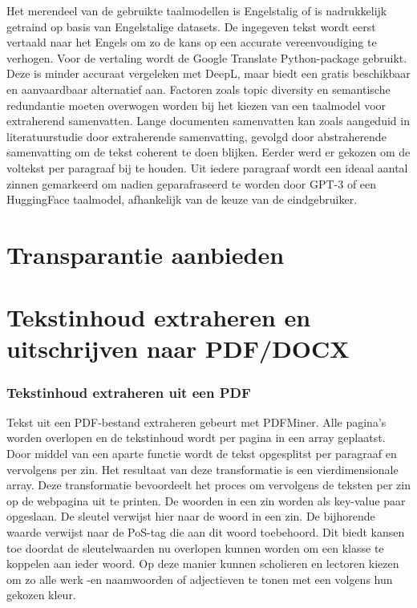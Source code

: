 Het merendeel van de gebruikte taalmodellen is Engelstalig of is nadrukkelijk getraind op basis van Engelstalige datasets. De ingegeven tekst wordt eerst vertaald naar het Engels om zo de kans op een accurate vereenvoudiging te verhogen. Voor de vertaling wordt de Google Translate Python-package gebruikt. Deze is minder accuraat vergeleken met DeepL, maar biedt een gratis beschikbaar en aanvaardbaar alternatief aan. Factoren zoals topic diversity en semantische redundantie moeten overwogen worden bij het kiezen van een taalmodel voor extraherend samenvatten. Lange documenten samenvatten kan zoals aangeduid in literatuurstudie door extraherende samenvatting, gevolgd door abstraherende samenvatting om de tekst coherent te doen blijken. Eerder werd er gekozen om de voltekst per paragraaf bij te houden. Uit iedere paragraaf wordt een ideaal aantal zinnen gemarkeerd om nadien geparafraseerd te worden door GPT-3 of een HuggingFace taalmodel, afhankelijk van de keuze van de eindgebruiker.


\section{Transparantie aanbieden}


\section{Tekstinhoud extraheren en uitschrijven naar PDF/DOCX}

\subsubsection{Tekstinhoud extraheren uit een PDF}

Tekst uit een PDF-bestand extraheren gebeurt met PDFMiner. Alle pagina's worden overlopen en de tekstinhoud wordt per pagina in een array geplaatst. Door middel van een aparte functie wordt de tekst opgesplitst per paragraaf en vervolgens per zin. Het resultaat van deze transformatie is een vierdimensionale array. Deze transformatie bevoordeelt het proces om vervolgens de teksten per zin op de webpagina uit te printen. De woorden in een zin worden als key-value paar opgeslaan. De sleutel verwijst hier naar de woord in een zin. De bijhorende waarde verwijst naar de PoS-tag die aan dit woord toebehoord. Dit biedt kansen toe doordat de sleutelwaarden nu overlopen kunnen worden om een klasse te koppelen aan ieder woord. Op deze manier kunnen scholieren en lectoren kiezen om zo alle werk -en naamwoorden of adjectieven te tonen met een volgens hun gekozen kleur.


